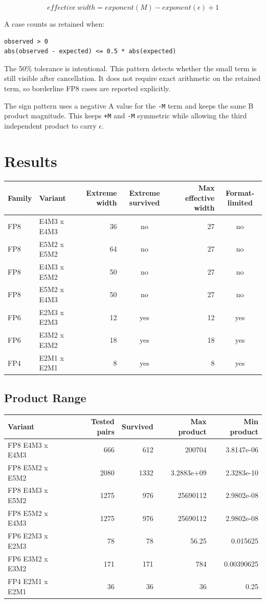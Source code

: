 \documentclass[11pt]{article}
\begin{document}
\begin{summarybox}
\[
  effective\ width = exponent(M) - exponent(\epsilon) + 1
\]
\end{summarybox}

A case counts as retained when:

\begin{lstlisting}
observed > 0
abs(observed - expected) <= 0.5 * abs(expected)
\end{lstlisting}

The 50\% tolerance is intentional. This pattern detects whether the small term
is still visible after cancellation. It does not require exact arithmetic on
the retained term, so borderline FP8 cases are reported explicitly.

The sign pattern uses a negative A value for the \texttt{-M} term and keeps the
same B product magnitude. This keeps \texttt{+M} and \texttt{-M} symmetric
while allowing the third independent product to carry \(\epsilon\).

\section{Results}

\begin{tabularx}{\linewidth}{l Y R C R C}
\toprule
Family & Variant & Extreme width & Extreme survived & Max effective width & Format-limited \\
\midrule
FP8 & E4M3 x E4M3 & 36 & no & 27 & no \\
FP8 & E5M2 x E5M2 & 64 & no & 27 & no \\
FP8 & E4M3 x E5M2 & 50 & no & 27 & no \\
FP8 & E5M2 x E4M3 & 50 & no & 27 & no \\
FP6 & E2M3 x E2M3 & 12 & yes & 12 & yes \\
FP6 & E3M2 x E3M2 & 18 & yes & 18 & yes \\
FP4 & E2M1 x E2M1 & 8 & yes & 8 & yes \\
\bottomrule
\end{tabularx}

\subsection{Product Range}

\begin{tabularx}{\linewidth}{Y R R R R}
\toprule
Variant & Tested pairs & Survived & Max product & Min product \\
\midrule
FP8 E4M3 x E4M3 & 666 & 612 & 200704 & 3.8147e-06 \\
FP8 E5M2 x E5M2 & 2080 & 1332 & 3.2883e+09 & 2.3283e-10 \\
FP8 E4M3 x E5M2 & 1275 & 976 & 25690112 & 2.9802e-08 \\
FP8 E5M2 x E4M3 & 1275 & 976 & 25690112 & 2.9802e-08 \\
FP6 E2M3 x E2M3 & 78 & 78 & 56.25 & 0.015625 \\
FP6 E3M2 x E3M2 & 171 & 171 & 784 & 0.00390625 \\
FP4 E2M1 x E2M1 & 36 & 36 & 36 & 0.25 \\
\bottomrule
\end{tabularx}
\end{document}
